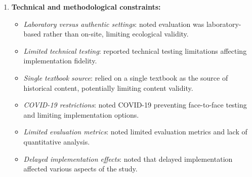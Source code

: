 \documentclass[a4paper,fleqn]{cas-sc}
\begin{document}
\begin{enumerate}[noitemsep]
\begin{itemize}[noitemsep]
 \item \textit{Novelty effects}: \citet{47Clara2010156} explicitly mentioned possible ``novelty effect'' where initial enthusiasm might not reflect sustained educational value.
 
 \item \textit{Memory effects}: \citet{64Hsu201324} noted short-term memory effects in the text comparison group potentially skewing results.
 
 \item \textit{Multiple uncontrolled variables}: \citet{72hutauruk2020utilization} reported too many variables (330) for proper multivariate analysis given the sample size.
 
 \item \textit{Heterogeneous class backgrounds}: \citet{28Chao201734} noted heterogeneous class backgrounds as potential confounds.
\end{itemize}

	\item 
\textbf{Technical and methodological constraints:}

\begin{itemize}[noitemsep]
 \item \textit{Laboratory versus authentic settings}: \citet{49Huizenga2007127} noted evaluation was laboratory-based rather than on-site, limiting ecological validity.
 
 \item \textit{Limited technical testing}: \citet{60Hoy2018} reported technical testing limitations affecting implementation fidelity.
 
 \item \textit{Single textbook source}: \citet{22Nugroho2020149} relied on a single textbook as the source of historical content, potentially limiting content validity.
 
 \item \textit{COVID-19 restrictions}: \citet{22Nugroho2020149, 77Ramansyah2021} noted COVID-19 preventing face-to-face testing and limiting implementation options.
 
 \item \textit{Limited evaluation metrics}: \citet{22Nugroho2020149, 80gottlieb2018your} noted limited evaluation metrics and lack of quantitative analysis.
 
 \item \textit{Delayed implementation effects}: \citet{60Hoy2018} noted that delayed implementation affected various aspects of the study.
\end{itemize}


\end{enumerate}
\end{document}
